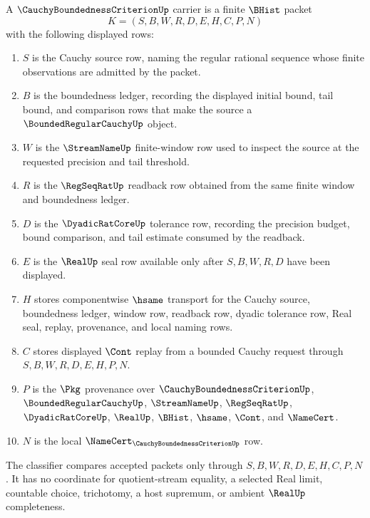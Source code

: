 \begin{definition}
\label{def:cauchy-boundedness-criterion-carrier}
A $\CauchyBoundednessCriterionUp$ carrier is a finite $\BHist$ packet
$$
K=(S,B,W,R,D,E,H,C,P,N)
$$
with the following displayed rows:
\begin{enumerate}
\item $S$ is the Cauchy source row, naming the regular rational sequence whose finite observations are admitted by the packet.
\item $B$ is the boundedness ledger, recording the displayed initial bound, tail bound, and comparison rows that make the source a $\BoundedRegularCauchyUp$ object.
\item $W$ is the $\StreamNameUp$ finite-window row used to inspect the source at the requested precision and tail threshold.
\item $R$ is the $\RegSeqRatUp$ readback row obtained from the same finite window and boundedness ledger.
\item $D$ is the $\DyadicRatCoreUp$ tolerance row, recording the precision budget, bound comparison, and tail estimate consumed by the readback.
\item $E$ is the $\RealUp$ seal row available only after $S,B,W,R,D$ have been displayed.
\item $H$ stores componentwise $\hsame$ transport for the Cauchy source, boundedness ledger, window row, readback row, dyadic tolerance row, Real seal, replay, provenance, and local naming rows.
\item $C$ stores displayed $\Cont$ replay from a bounded Cauchy request through $S,B,W,R,D,E,H,P,N$.
\item $P$ is the $\Pkg$ provenance over $\CauchyBoundednessCriterionUp$, $\BoundedRegularCauchyUp$, $\StreamNameUp$, $\RegSeqRatUp$, $\DyadicRatCoreUp$, $\RealUp$, $\BHist$, $\hsame$, $\Cont$, and $\NameCert$.
\item $N$ is the local $\NameCert_{\CauchyBoundednessCriterionUp}$ row.
\end{enumerate}
The classifier compares accepted packets only through $S,B,W,R,D,E,H,C,P,N$. It has no coordinate for quotient-stream equality, a selected Real limit, countable choice, trichotomy, a host supremum, or ambient $\RealUp$ completeness.
\end{definition}

